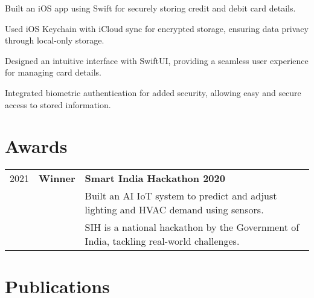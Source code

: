 \documentclass[]{deedy-resume-openfont}
\begin{document}
\textbf{\href{https://github.com/swiftlysingh/Holder}{}} 
\begin{tightemize}
    \item Built an iOS app using Swift for securely storing credit and debit card details.
    \item Used iOS Keychain with iCloud sync for encrypted storage, ensuring data privacy through local-only storage.
    \item Designed an intuitive interface with SwiftUI, providing a seamless user experience for managing card details.
    \item Integrated biometric authentication for added security, allowing easy and secure access to stored information.
\end{tightemize}


\section{Awards} 
\begin{tabular}{rll}
2021 & \textbf{Winner} & \textbf{Smart India Hackathon 2020} \\
     & & Built an AI IoT system to predict and adjust lighting and HVAC demand using sensors. \\
     & & SIH is a national hackathon by the Government of India, tackling real-world challenges.
\end{tabular}
\sectionsep


\section{Publications} 
\renewcommand\refname{\vskip -1.5em} %


\nocite{*}
\end{document}
